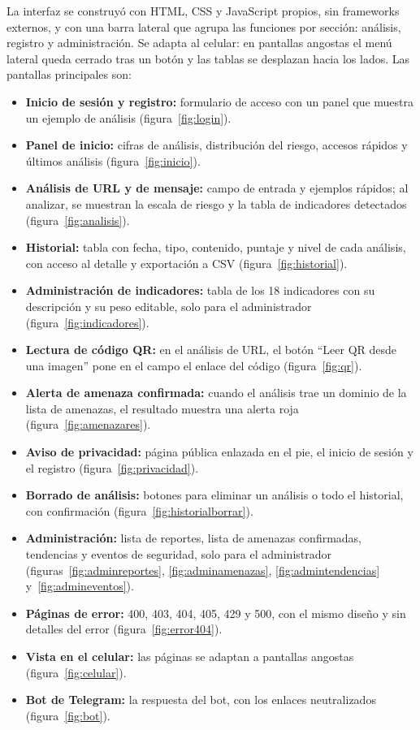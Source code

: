 \documentclass[journal,onecolumn,12pt,draftclsnofoot]{IEEEtran}
\begin{document}
La interfaz se construyó con HTML, CSS y JavaScript propios, sin frameworks externos, y con una barra lateral que agrupa las funciones por sección: análisis, registro y administración. Se adapta al celular: en pantallas angostas el menú lateral queda cerrado tras un botón y las tablas se desplazan hacia los lados. Las pantallas principales son:

\begin{itemize}
  \item \textbf{Inicio de sesión y registro:} formulario de acceso con un panel que muestra un ejemplo de análisis (figura~\ref{fig:login}).
  \item \textbf{Panel de inicio:} cifras de análisis, distribución del riesgo, accesos rápidos y últimos análisis (figura~\ref{fig:inicio}).
  \item \textbf{Análisis de URL y de mensaje:} campo de entrada y ejemplos rápidos; al analizar, se muestran la escala de riesgo y la tabla de indicadores detectados (figura~\ref{fig:analisis}).
  \item \textbf{Historial:} tabla con fecha, tipo, contenido, puntaje y nivel de cada análisis, con acceso al detalle y exportación a CSV (figura~\ref{fig:historial}).
  \item \textbf{Administración de indicadores:} tabla de los 18 indicadores con su descripción y su peso editable, solo para el administrador (figura~\ref{fig:indicadores}).
  \item \textbf{Lectura de código QR:} en el análisis de URL, el botón ``Leer QR desde una imagen'' pone en el campo el enlace del código (figura~\ref{fig:qr}).
  \item \textbf{Alerta de amenaza confirmada:} cuando el análisis trae un dominio de la lista de amenazas, el resultado muestra una alerta roja (figura~\ref{fig:amenazares}).
  \item \textbf{Aviso de privacidad:} página pública enlazada en el pie, el inicio de sesión y el registro (figura~\ref{fig:privacidad}).
  \item \textbf{Borrado de análisis:} botones para eliminar un análisis o todo el historial, con confirmación (figura~\ref{fig:historialborrar}).
  \item \textbf{Administración:} lista de reportes, lista de amenazas confirmadas, tendencias y eventos de seguridad, solo para el administrador (figuras~\ref{fig:adminreportes}, \ref{fig:adminamenazas}, \ref{fig:admintendencias} y~\ref{fig:admineventos}).
  \item \textbf{Páginas de error:} 400, 403, 404, 405, 429 y 500, con el mismo diseño y sin detalles del error (figura~\ref{fig:error404}).
  \item \textbf{Vista en el celular:} las páginas se adaptan a pantallas angostas (figura~\ref{fig:celular}).
  \item \textbf{Bot de Telegram:} la respuesta del bot, con los enlaces neutralizados (figura~\ref{fig:bot}).
\end{itemize}
\end{document}
